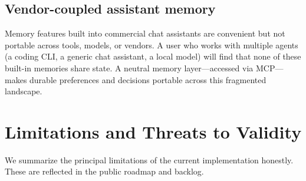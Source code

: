 \documentclass[11pt,a4paper]{article}
\begin{document}
\subsection{Vendor-coupled assistant memory}

Memory features built into commercial chat assistants are convenient but not portable across tools, models, or vendors. A user who works with multiple agents (a coding CLI, a generic chat assistant, a local model) will find that none of these built-in memories share state. A neutral memory layer---accessed via MCP---makes durable preferences and decisions portable across this fragmented landscape.

\section{Limitations and Threats to Validity}

We summarize the principal limitations of the current implementation honestly. These are reflected in the public roadmap and backlog.
\end{document}
